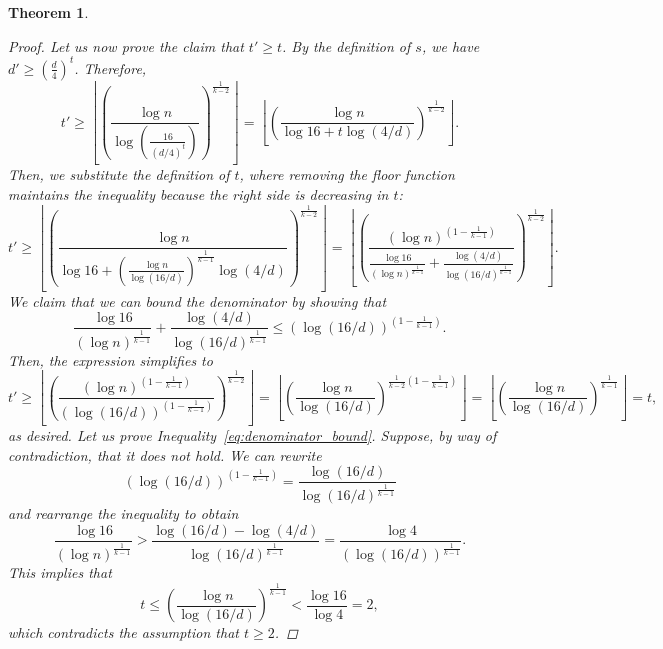 \documentclass{amsart}
\newtheorem{theorem}[subsection]{Theorem}
\begin{document}
\begin{theorem}
\begin{proof}
            Let us now prove the claim that $t' \geq t$.
            By the definition of $s$, we have $d' \geq \left( \frac{d}{4}\right)^t$.
            Therefore,
            \[
                t' \geq
                \left\lfloor \left(  \frac{\log n}{\log \left(\frac{16}{(d/4)^t}\right)}\right)^
                {\frac{1}{k-2}}\right\rfloor =
                \left\lfloor \left(  \frac{\log n}{\log 16 + t \log (4/d)}\right)^{\frac{1}{k-2}}\right\rfloor.
            \]
            Then, we substitute the definition of $t$, where removing the floor function
            maintains the inequality because the right side is decreasing in $t$:
            \begin{equation*}
                t' \geq
                \left\lfloor \left(  \frac{\log n}
                {\log 16 + \left(  \frac{\log n}{\log (16/d)}\right)^{\frac{1}{k-1}}  \log (4/d)}\right)^
                {\frac{1}{k-2}}\right\rfloor
                =
                \left\lfloor \left(  \frac{(\log n)^{\left(1-\frac{1}{k-1}\right)}}
                {\frac{\log 16}{(\log n)^{\frac{1}{k-1}}} + \frac{\log (4/d)}{\log (16/d)^{\frac{1}{k-1}}} }
               \right)^{\frac{1}{k-2}}\right\rfloor.
            \end{equation*}
            We claim that we can bound the denominator by showing that
            \begin{equation} \label{eq:denominator_bound}
                \frac{\log 16}{(\log n)^{\frac{1}{k-1}}} + \frac{\log (4/d)}{\log (16/d)^{\frac{1}{k-1}}}
                \leq \left( \log (16/d)\right)^{\left( 1 - \frac{1}{k-1}\right)}.
            \end{equation}
            Then, the expression simplifies to
            \[
                t'
                \geq \left\lfloor \left(  \frac{(\log n)^{\left(1-\frac{1}{k-1}\right)}}
                {\left( \log (16/d)\right)^{\left( 1 - \frac{1}{k-1}\right)}}
                \right)^{\frac{1}{k-2}}\right\rfloor
                = \left\lfloor \left(  \frac{\log n}
                {\log (16/d)}
                \right)^{\frac{1}{k-2}\left( 1 - \frac{1}{k-1}\right)}\right\rfloor
                = \left\lfloor \left(  \frac{\log n}{\log (16/d)}\right)^{\frac{1}{k-1}}\right\rfloor
                = t,
            \]
            as desired.
            Let us prove Inequality~\eqref{eq:denominator_bound}.
            Suppose, by way of contradiction, that it does not hold.
            We can rewrite
            \[
                (\log (16/d))^{\left( 1 - \frac{1}{k-1}\right)}
                = \frac{\log (16/d)}{\log (16/d)^{\frac{1}{k-1}}}
            \]
            and rearrange the inequality to obtain
            \[
                \frac{\log 16}{(\log n)^{\frac{1}{k-1}}}
                > \frac{\log (16/d) - \log (4/d)}{\log (16/d)^{\frac{1}{k-1}}}
                = \frac{\log 4}{(\log (16/d))^{\frac{1}{k-1}}}.
            \]
            This implies that
            \[
                t
                \leq \left( \frac{\log n}{\log (16/d)}\right)^{\frac{1}{k-1}}
                < \frac{\log 16}{\log 4} = 2,
            \]
            which contradicts the assumption that $t \geq 2$.
        \end{proof}
    \end{theorem}
\end{document}
